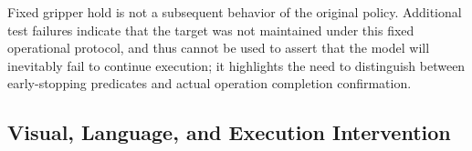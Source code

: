 
Fixed gripper hold is not a subsequent behavior of the original policy. Additional test failures indicate that the target was not maintained under this fixed operational protocol, and thus cannot be used to assert that the model will inevitably fail to continue execution; it highlights the need to distinguish between early-stopping predicates and actual operation completion confirmation.

\subsection{Visual, Language, and Execution Intervention}\label{s08-detail-6}

